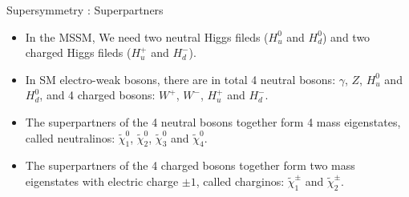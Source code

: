 \documentclass[mathserif,serif]{beamer}
\begin{document}
\begin{frame}{Supersymmetry : Superpartners}
\begin{itemize}
\item In the MSSM, We need two neutral Higgs fileds ($H^0_u$ and $H^0_d$) and two charged Higgs fileds ($H^+_u$ and $H^-_d$).
\item In SM electro-weak bosons, there are in total 4 neutral bosons: $\gamma$, $Z$, $H^0_u$ and $H^0_d$, and 4 charged bosons: $W^+$, $W^-$, $H^+_u$ and $H^-_d$.
\item The superpartners of the 4 neutral bosons together form 4 mass eigenstates, called neutralinos: $\tilde{\chi}_1^0$, $\tilde{\chi}_2^0$, $\tilde{\chi}_3^0$ and $\tilde{\chi}_4^0$.
\item The superpartners of the 4 charged bosons together form two mass eigenstates with electric charge $\pm 1$, called charginos: $\tilde{\chi}_1^\pm$ and $\tilde{\chi}_2^\pm$.
\end{itemize}

\begin{table}[htbp]
\tiny
\centering
{}
\caption{\scriptsize The spin and R-parity for the Standard Model particles and their superpartners.}
\end{table}

\end{frame}
\end{document}
